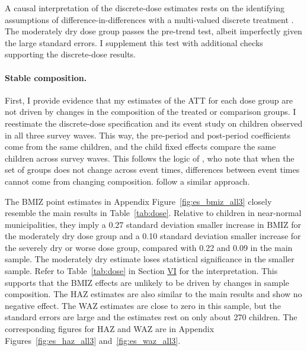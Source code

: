 \documentclass[12pt]{article}
\begin{document}
A causal interpretation of the discrete-dose estimates rests on the identifying assumptions of difference-in-differences with a multi-valued discrete treatment \parencite{callawayDifferenceinDifferencesContinuousTreatment2024}. The moderately dry dose group passes the pre-trend test, albeit imperfectly given the large standard errors. I supplement this test with additional checks supporting the discrete-dose results.

\paragraph{Stable composition.} First, I provide evidence that my estimates of the ATT for each dose group are not driven by changes in the composition of the treated or comparison groups. I reestimate the discrete-dose specification and its event study on children observed in all three survey waves. This way, the pre-period and post-period coefficients come from the same children, and the child fixed effects compare the same children across survey waves. This follows the logic of \textcite{callawayDifferenceinDifferencesMultipleTime2021}, who note that when the set of groups does not change across event times, differences between event times cannot come from changing composition. \textcite{baileyWarPovertysExperiment2015} follow a similar approach.

The BMIZ point estimates in Appendix Figure~\ref{fig:es_bmiz_all3} closely resemble the main results in Table~\ref{tab:dose}. Relative to children in near-normal municipalities, they imply a 0.27 standard deviation smaller increase in BMIZ for the moderately dry dose group and a 0.10 standard deviation smaller increase for the severely dry or worse dose group, compared with 0.22 and 0.09 in the main sample. The moderately dry estimate loses statistical significance in the smaller sample. Refer to Table~\ref{tab:dose} in Section \hyperref[sec:VI]{VI} for the interpretation. This supports that the BMIZ effects are unlikely to be driven by changes in sample composition. The HAZ estimates are also similar to the main results and show no negative effect. The WAZ estimates are close to zero in this sample, but the standard errors are large and the estimates rest on only about 270 children. The corresponding figures for HAZ and WAZ are in Appendix Figures~\ref{fig:es_haz_all3} and~\ref{fig:es_waz_all3}.
\end{document}
